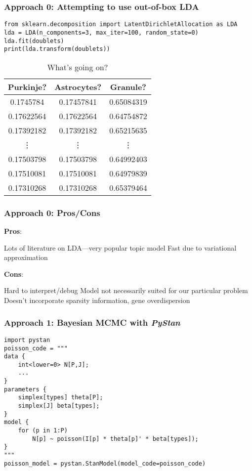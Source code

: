 \documentclass{beamer}
\begin{document}
\begin{frame}[fragile]
    \frametitle{Approach 0: Attempting to use out-of-box LDA}
\begin{verbatim}
from sklearn.decomposition import LatentDirichletAllocation as LDA
lda = LDA(n_components=3, max_iter=100, random_state=0)
lda.fit(doublets)
print(lda.transform(doublets))
\end{verbatim}
    \begin{table}
        \centering
            \footnotesize
        \begin{tabular}{c|c|c}
            \textbf{Purkinje?} & \textbf{Astrocytes?} & \textbf{Granule?}\\
            \hline
            0.1745784 &0.17457841&0.65084319
            \\ 0.17622564& 0.17622564&0.64754872
            \\ 0.17392182&0.17392182&0.65215635
            \\ \vdots & \vdots & \vdots
            \\ 0.17503798&0.17503798&0.64992403
            \\ 0.17510081&0.17510081&0.64979839
            \\ 0.17310268&0.17310268&0.65379464
        \end{tabular}
        \caption{What's going on?}
    \end{table}
\end{frame}

\begin{frame}
    \frametitle{Approach 0: Pros/Cons}
    \begin{itemize}
        \ii \textbf{Pros}:
        \begin{itemize}
            \ii
            Lots of literature on LDA---very popular topic model
            \ii Fast due to variational approximation
        \end{itemize}
        \ii \textbf{Cons}:
        \begin{itemize}
            \ii
            Hard to interpret/debug
            \ii Model not necessarily suited for our particular problem
            \ii Doesn't incorporate sparsity information, gene overdispersion
        \end{itemize}
    \end{itemize}
\end{frame}

\begin{frame}[fragile]
    \frametitle{Approach 1: Bayesian MCMC with \textit{PyStan}}
\begin{verbatim}
import pystan
poisson_code = """
data {    
    int<lower=0> N[P,J];
    ...
}    
parameters {
    simplex[types] theta[P];
    simplex[J] beta[types];
}    
model {    
    for (p in 1:P)    
        N[p] ~ poisson(I[p] * theta[p]' * beta[types]);
}
"""
poisson_model = pystan.StanModel(model_code=poisson_code)
\end{verbatim}
\end{frame}
\end{document}

